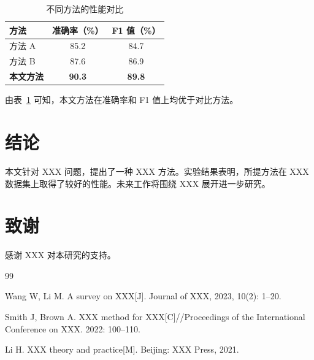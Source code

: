 \documentclass[12pt, a4paper]{ctexart}
\begin{document}
\begin{table}[htbp]
\centering
\caption{不同方法的性能对比}
\label{tab:results}
\begin{tabular}{lcc}
\toprule
方法 & 准确率（\%） & F1 值（\%） \\
\midrule
方法 A & 85.2 & 84.7 \\
方法 B & 87.6 & 86.9 \\
\textbf{本文方法} & \textbf{90.3} & \textbf{89.8} \\
\bottomrule
\end{tabular}
\end{table}

由表~\ref{tab:results} 可知，本文方法在准确率和 F1 值上均优于对比方法。

\section{结论}
\label{sec:conclusion}

本文针对 XXX 问题，提出了一种 XXX 方法。实验结果表明，所提方法在 XXX 数据集上取得了较好的性能。未来工作将围绕 XXX 展开进一步研究。

\section*{致谢}
感谢 XXX 对本研究的支持。

\begin{thebibliography}{99}

Wang W, Li M. A survey on XXX[J]. Journal of XXX, 2023, 10(2): 1--20.

Smith J, Brown A. XXX method for XXX[C]//Proceedings of the International Conference on XXX. 2022: 100--110.

Li H. XXX theory and practice[M]. Beijing: XXX Press, 2021.

\end{thebibliography}
\end{document}

